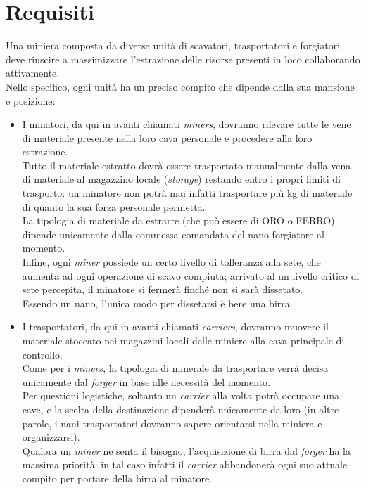 \documentclass{llncs}
\begin{document}
\section{Requisiti}
Una miniera composta da diverse unità di scavatori, trasportatori e forgiatori deve riuscire a massimizzare l'estrazione delle risorse presenti in loco collaborando attivamente.\\
Nello specifico, ogni unità ha un preciso compito che dipende dalla sua mansione e posizione:
\begin{itemize}
\item I minatori, da qui in avanti chiamati \textit{miners}, dovranno rilevare tutte le vene di materiale presente nella loro cava personale e procedere alla loro estrazione.\\
Tutto il materiale estratto dovrà essere trasportato manualmente dalla vena di materiale al magazzino locale (\textit{storage}) restando entro i propri limiti di trasporto: un minatore non potrà mai infatti trasportare più kg di materiale di quanto la sua forza personale permetta.\\
La tipologia di materiale da estrarre (che può essere di ORO o FERRO) dipende unicamente dalla commessa comandata del nano forgiatore al momento.\\Infine, ogni \textit{miner} possiede un certo livello di tolleranza alla sete, che aumenta ad ogni operazione di scavo compiuta; arrivato al un livello critico di sete percepita, il minatore si fermerà finché non si sarà dissetato.\\
Essendo un nano, l'unica modo per dissetarsi è bere una birra.\\
\item I trasportatori, da qui in avanti chiamati \textit{carriers}, dovranno muovere il materiale stoccato nei magazzini locali delle miniere alla cava principale di controllo.\\Come per i \textit{miners}, la tipologia di minerale da trasportare verrà decisa unicamente dal \textit{forger} in base alle necessità del momento.\\
Per questioni logistiche, soltanto un \textit{carrier} alla volta potrà occupare una cave, e la scelta della destinazione dipenderà unicamente da loro (in altre parole, i nani trasportatori dovranno sapere orientarsi nella miniera e organizzarsi).\\
Qualora un \textit{miner} ne senta il bisogno, l'acquisizione di birra dal \textit{forger} ha la massima priorità: in tal caso infatti il \textit{carrier} abbandonerà ogni suo attuale compito per portare della birra al minatore.\\

\end{itemize}
\end{document}
